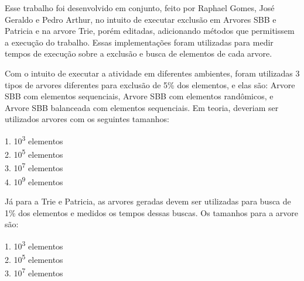 \label{Introdução}

Esse trabalho foi desenvolvido em conjunto, feito por Raphael Gomes, José Geraldo e Pedro Arthur, no intuito de executar exclusão em Arvores SBB e Patricia\cite{nivioziviani} e na arvore Trie\cite{Samuellucas97}, porém editadas, adicionando métodos que permitissem a execução do trabalho. Essas implementações foram utilizadas para medir tempos de execução sobre a exclusão e busca de elementos de cada arvore.

Com o intuito de executar a atividade em diferentes ambientes, foram utilizadas 3 tipos de arvores diferentes para exclusão de 5\% dos elementos, e elas são: Arvore SBB com elementos sequenciais, Arvore SBB com elementos randômicos, e Arvore SBB balanceada com elementos sequenciais. Em teoria, deveriam ser utilizados arvores com os seguintes tamanhos:
        \begin{center}
        1. 10\textsuperscript{3} elementos\\
        2. 10\textsuperscript{5} elementos\\ 
        3. 10\textsuperscript{7} elementos\\
        4. 10\textsuperscript{9} elementos
        \end{center}

Já para a Trie e Patricia, as arvores geradas devem ser utilizadas para busca de 1\% dos elementos e medidos os tempos dessas buscas. Os tamanhos para a arvore são:
        \begin{center}
        1. 10\textsuperscript{3} elementos\\
        2. 10\textsuperscript{5} elementos\\ 
        3. 10\textsuperscript{7} elementos\\
        \end{center}
